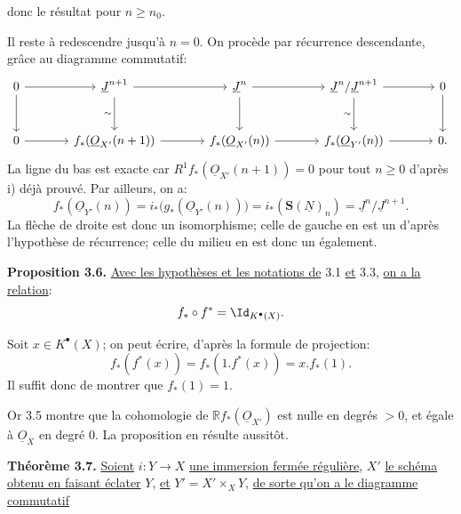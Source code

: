 
donc le résultat pour \(n\ge n_0\).

Il reste à redescendre jusqu'à \(n=0\). On procède par récurrence descendante, grâce au diagramme commutatif:
\[
\begin{tikzcd}[column sep=large,row sep=large]
0 \arrow[r] \arrow[d] &
\underline{J}^{n+1} \arrow[r] \arrow[d,"\sim"'] &
\underline{J}^n \arrow[r] \arrow[d] &
\underline{J}^n/\underline{J}^{n+1} \arrow[r] \arrow[d,"\sim"'] &
0 \arrow[d]\\
0 \arrow[r] &
f_*(\underline{O}_{X'}(n+1)) \arrow[r] &
f_*(\underline{O}_{X'}(n)) \arrow[r] &
f_*(\underline{O}_{Y'}(n)) \arrow[r] &
0.
\end{tikzcd}
\]
La ligne du bas est exacte car \(R^1f_*(\underline{O}_{X'}(n+1))=0\) pour tout \(n\ge0\) d'après i) déjà prouvé. Par ailleurs, on a:
\[
f_*(\underline{O}_{Y'}(n))
=i_*\bigl(g_*(\underline{O}_{Y'}(n))\bigr)
=i_*(\mathbf S(\underline{N})_n)
=\underline{J}^n/\underline{J}^{n+1}.
\]
La flèche de droite est donc un isomorphisme; celle de gauche en est un d'après l'hypothèse de récurrence; celle du milieu en est donc un également.

\textbf{Proposition 3.6.} \uline{Avec les hypothèses et les notations de} 3.1 \uline{et} 3.3, \uline{on a la relation}:
\[
f_*\circ f^*=\Id_{K^{\bullet}(X)}.
\]

Soit \(x\in K^{\bullet}(X)\); on peut écrire, d'après la formule de projection:
\[
f_*(f^*(x))=f_*(1.f^*(x))=x.f_*(1).
\]
Il suffit donc de montrer que \(f_*(1)=1\).

Or 3.5 montre que la cohomologie de \(\mathbb Rf_*(\underline{O}_{X'})\) est nulle en degrés \(>0\), et égale à \(\underline{O}_X\) en degré \(0\). La proposition en résulte aussitôt.

\textbf{Théorème 3.7.} \uline{Soient} \(i:Y\to X\) \uline{une immersion fermée régulière}, \(X'\) \uline{le schéma obtenu en faisant éclater} \(Y\), \uline{et} \(Y'=X'\times_XY\), \uline{de sorte qu'on a le diagramme commutatif}

